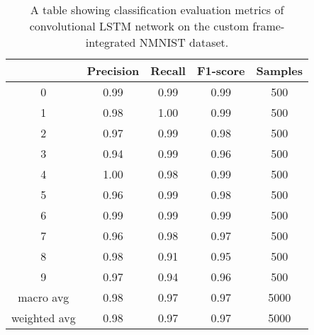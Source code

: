 \begin{table}[htb]
    \centering
    \begin{tabular}{|| c | c | c | c | c ||}
        \hline
             & Precision & Recall & F1-score & Samples \\
        \hline \hline
        0            & 0.99 & 0.99 & 0.99 & 500  \\
        \hline
        1            & 0.98 & 1.00 & 0.99 & 500  \\
        \hline
        2            & 0.97 & 0.99 & 0.98 & 500  \\
        \hline
        3            & 0.94 & 0.99 & 0.96 & 500  \\
        \hline
        4            & 1.00 & 0.98 & 0.99 & 500  \\
        \hline
        5            & 0.96 & 0.99 & 0.98 & 500  \\
        \hline
        6            & 0.99 & 0.99 & 0.99 & 500  \\
        \hline
        7            & 0.96 & 0.98 & 0.97 & 500  \\
        \hline
        8            & 0.98 & 0.91 & 0.95 & 500  \\
        \hline
        9            & 0.97 & 0.94 & 0.96 & 500  \\
        \hline
        macro avg    & 0.98 & 0.97 & 0.97 & 5000 \\
        \hline
        weighted avg & 0.98 & 0.97 & 0.97 & 5000 \\
        \hline
    \end{tabular}
    \caption{A table showing classification evaluation metrics of convolutional LSTM network on the custom frame-integrated NMNIST dataset.}
    \label{tab:conv_lstm_nmnist_custom_frame_evaluation_metrics}
\end{table}


